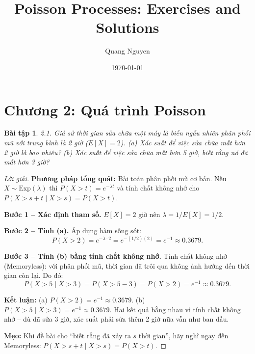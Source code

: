 \documentclass[8pt,a4paper]{article}
\title{Poisson Processes: Exercises and Solutions}
\author{Quang Nguyen}
\date{\today}
\newtheorem{exercise}{Bài tập}
\newenvironment{solution}{\begin{proof}[Lời giải]}{\end{proof}}
\begin{document}
\maketitle

\section*{Chương 2: Quá trình Poisson}

\begin{exercise}
2.1. Giả sử thời gian sửa chữa một máy là biến ngẫu nhiên phân phối mũ với trung bình là 2 giờ ($E[X] = 2$). 
(a) Xác suất để việc sửa chữa mất hơn 2 giờ là bao nhiêu?
(b) Xác suất để việc sửa chữa mất hơn 5 giờ, biết rằng nó đã mất hơn 3 giờ?
\end{exercise}
\begin{solution}
\textbf{Phương pháp tổng quát:} Bài toán phân phối mũ cơ bản. Nếu $X \sim \text{Exp}(\lambda)$ thì $P(X > t) = e^{-\lambda t}$ và tính chất không nhớ cho $P(X > s+t \mid X > s) = P(X > t)$.

\textbf{Bước 1 -- Xác định tham số.} $E[X] = 2$ giờ nên $\lambda = 1/E[X] = \boxed{1/2}$.

\textbf{Bước 2 -- Tính (a).} Áp dụng hàm sống sót:
\[
  P(X > 2) = e^{-\lambda \cdot 2} = e^{-(1/2)(2)} = \boxed{e^{-1} \approx 0.3679}.
\]

\textbf{Bước 3 -- Tính (b) bằng tính chất không nhớ.} Tính chất không nhớ (Memoryless): với phân phối mũ, thời gian đã trôi qua không ảnh hưởng đến thời gian còn lại. Do đó:
\[
  P(X > 5 \mid X > 3) = P(X > 5-3) = P(X > 2) = \boxed{e^{-1} \approx 0.3679}.
\]

\textbf{Kết luận:} (a) $P(X>2) = e^{-1} \approx 0.3679$. (b) $P(X>5 \mid X>3) = e^{-1} \approx 0.3679$. Hai kết quả bằng nhau vì tính chất không nhớ -- dù đã sửa 3 giờ, xác suất phải sửa thêm 2 giờ nữa vẫn như ban đầu.

\textbf{Mẹo:} Khi đề bài cho ``biết rằng đã xảy ra $s$ thời gian'', hãy nghĩ ngay đến Memoryless: $P(X > s+t \mid X > s) = P(X > t)$.
\end{solution}
\end{document}
